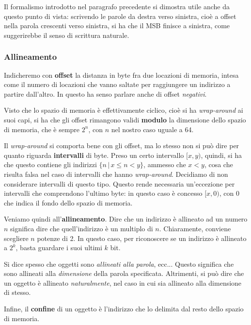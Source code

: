 \documentclass[a4paper,11pt]{article}
\begin{document}
Il formalismo introdotto nel paragrafo precedente si dimostra utile anche da questo punto di vista: scrivendo le parole da destra verso sinistra, cioè a offset nella parola crescenti verso sinistra, si ha che il MSB finisce a sinistra, come suggerirebbe il senso di scrittura naturale.

\subsubsection{Allineamento}
Indicheremo con \textbf{offset} la distanza in byte fra due locazioni di memoria, intesa come il numero di locazioni che vanno saltate per raggiungere un indirizzo a partire dall'altro.
In questo ha senso parlare anche di offset \textit{negativi}.

Visto che lo spazio di memoria è effettivamente ciclico, cioè si ha \textit{wrap-around} ai suoi capi, si ha che gli offset rimangono validi \textbf{modulo} la dimensione dello spazio di memoria, che è sempre $2^n$, con $n$ nel nostro caso uguale a 64.

Il \textit{wrap-around} si comporta bene con gli offset, ma lo stesso non si può dire per quanto riguarda \textbf{intervalli} di byte.
Preso un certo intervallo $[x, y)$, quindi, si ha che questo contiene gli indirizzi $\{n \, | \, x \leq n < y\}$, ammesso che $x < y$, cosa che risulta falsa nel caso di intervalli che hanno \textit{wrap-around}. 
Decidiamo di non considerare intervalli di questo tipo.
Questo rende necessaria un'eccezione per intervalli che comprendono l'ultimo byte: in questo caso è concesso $[x, 0)$, con 0 che indica il fondo dello spazio di memoria.

Veniamo quindi all'\textbf{allineamento}.
Dire che un indirizzo è allineato ad un numero $n$ significa dire che quell'indirizzo è un multiplo di $n$.
Chiaramente, conviene scegliere $n$ potenze di 2.
In questo caso, per riconoscere se un indirizzo è allineato a $2^k$, basta guardare i suoi ultimi $k$ bit.

Si dice spesso che oggetti sono \textit{allineati alla parola}, ecc...
Questo significa che sono allineati alla \textit{dimensione} della parola specificata.
Altrimenti, si può dire che un oggetto è allineato \textit{naturalmente}, nel caso in cui sia allineato alla dimensione di stesso.

Infine, il \textbf{confine} di un oggetto è l'indirizzo che lo delimita dal resto dello spazio di memoria.
\end{document}
